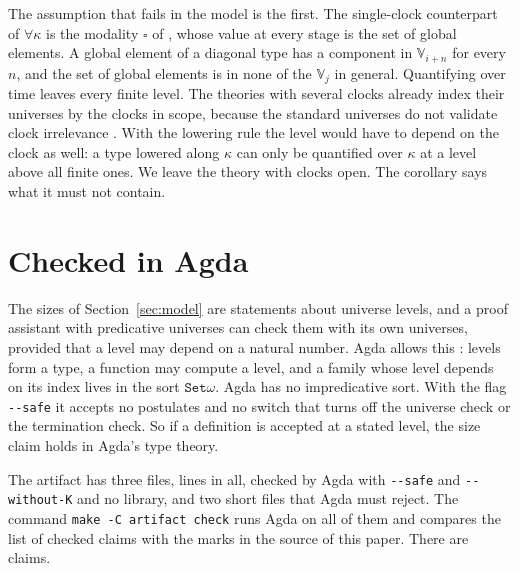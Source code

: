 \documentclass[acmsmall,nonacm,screen]{acmart}
\newcommand{\Vg}{\mathbb{V}}
\begin{document}
The assumption that fails in the model is the first. The single-clock counterpart of
$\forall\kappa$ is the modality $\square$ of \citet{Clouston2016}, whose value at every stage
is the set of global elements. A global element of a diagonal type has a component in
$\Vg_{i+n}$ for every $n$, and the set of global elements is in none of the $\Vg_j$ in
general. Quantifying over time leaves every finite level. The theories with several clocks
already index their universes by the clocks in scope, because the standard universes do not
validate clock irrelevance \citep{BizjakMogelberg2020}. With the lowering rule the level
would have to depend on the clock as well: a type lowered along $\kappa$ can only be
quantified over $\kappa$ at a level above all finite ones. We leave the theory with clocks
open. The corollary says what it must not contain.

\section{Checked in Agda}\label{sec:agda}

The sizes of Section~\ref{sec:model} are statements about universe levels, and a proof
assistant with predicative universes can check them with its own universes, provided that a
level may depend on a natural number. Agda allows this \citep{AgdaManual}: levels form a type,
a function may compute a level, and a family whose level depends on its index lives in the
sort $\mathtt{Set}\omega$. Agda has no impredicative sort. With the flag
\texttt{-{}-safe} it accepts no postulates and no switch that turns off the universe check
or the termination check. So if a definition is accepted at a stated level, the size claim
holds in Agda's type theory.

The artifact has three files, \LinesAll{} lines in all, checked by Agda \AgdaVersion{} with
\texttt{-{}-safe} and \texttt{-{}-without-K} and no library, and two short files that Agda
must reject. The command \texttt{make -C artifact check} runs Agda on all of them and
compares the list of checked claims with the marks in the source of this paper. There are
\CheckedClaims{} claims.
\end{document}

